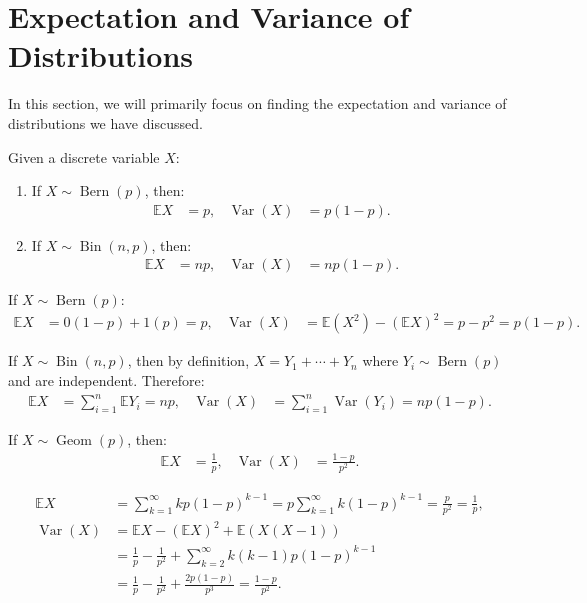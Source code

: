 \documentclass{huhtakm-template-book-v2}
\newcommand{\expect}{\mathbb{E}}
\DeclareMathOperator{\Bern}{Bern}
\DeclareMathOperator{\Bin}{Bin}
\DeclareMathOperator{\Geom}{Geom}
\DeclareMathOperator{\Var}{Var}
\begin{document}
\section{Expectation and Variance of Distributions}
    In this section, we will primarily focus on finding the expectation and variance of distributions we have discussed.
    \begin{thm}
        Given a discrete variable $X$:
        \begin{enumerate}
            \item If $X \sim \Bern(p)$, then:
            \begin{align*}
                \expect{X} &= p, & \Var(X) &= p(1-p).
            \end{align*}
            \item If $X \sim \Bin(n,p)$, then:
            \begin{align*}
                \expect{X} &= np, & \Var(X) &= np(1-p).
            \end{align*}
        \end{enumerate}
    \end{thm}
    \begin{proofing}
        \item If $X \sim \Bern(p)$:
        \begin{align*}
            \expect{X} &= 0(1-p) + 1(p) = p, & \Var(X) &= \expect(X^{2}) - (\expect{X})^{2} = p - p^{2} = p(1-p).
        \end{align*}
        \item If $X \sim \Bin(n,p)$, then by definition, $X = Y_{1} + \cdots + Y_{n}$ where $Y_{i} \sim \Bern(p)$ and are independent. Therefore:
        \begin{align*}
            \expect{X} &= \sum_{i = 1}^{n}\expect{Y_{i}} = np, & \Var(X) &= \sum_{i = 1}^{n}\Var(Y_{i}) = np(1-p).
        \end{align*}
    \end{proofing}
    \begin{thm}
        If $X \sim \Geom(p)$, then:
        \begin{align*}
            \expect{X} &= \frac{1}{p}, & \Var(X) &= \frac{1-p}{p^{2}}.
        \end{align*}
    \end{thm}
    \begin{proofing}
        \begin{align*}
            \expect{X} &= \sum_{k = 1}^{\infty} kp(1-p)^{k-1} = p\sum_{k = 1}^{\infty} k(1-p)^{k-1} = \frac{p}{p^{2}} = \frac{1}{p},\\
            \Var(X) &= \expect{X} - (\expect{X})^{2} + \expect(X(X-1))\\
            &= \frac{1}{p} - \frac{1}{p^{2}} + \sum_{k = 2}^{\infty} k(k-1)p(1-p)^{k-1}\\
            &= \frac{1}{p} - \frac{1}{p^{2}} + \frac{2p(1-p)}{p^{3}} = \frac{1-p}{p^{2}}.
        \end{align*}
    \end{proofing}
\end{document}
